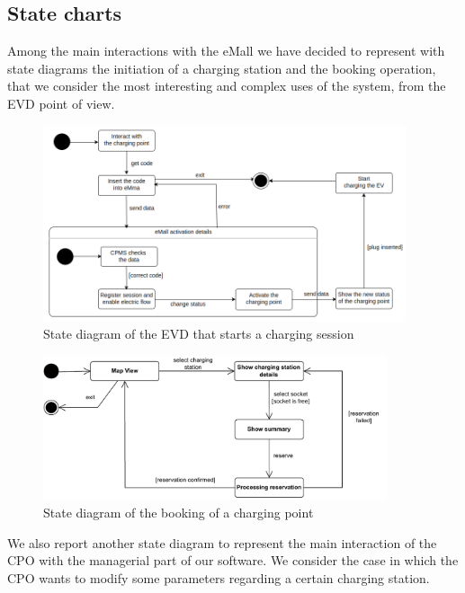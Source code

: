 \subsection{State charts}
Among the main interactions with the eMall we have decided to represent with state diagrams the initiation of a charging station and the booking operation, that we consider the most interesting and complex uses of the system, from the EVD point of view.

\begin{figure}[H]
    \centering
    \includegraphics[width=0.95\textwidth]{Images/ChargingNow.png}
    \caption{State diagram of the EVD that starts a charging session}
\end{figure}

\begin{figure}[H]
    \centering
    \includegraphics[width=0.9\textwidth]{Images/booking_charge_state_diag}
    \caption{State diagram of the booking of a charging point}
\end{figure}

We also report another state diagram to represent the main interaction of the CPO with the managerial part of our software. We consider the case in which the CPO wants to modify some parameters regarding a certain charging station. 

